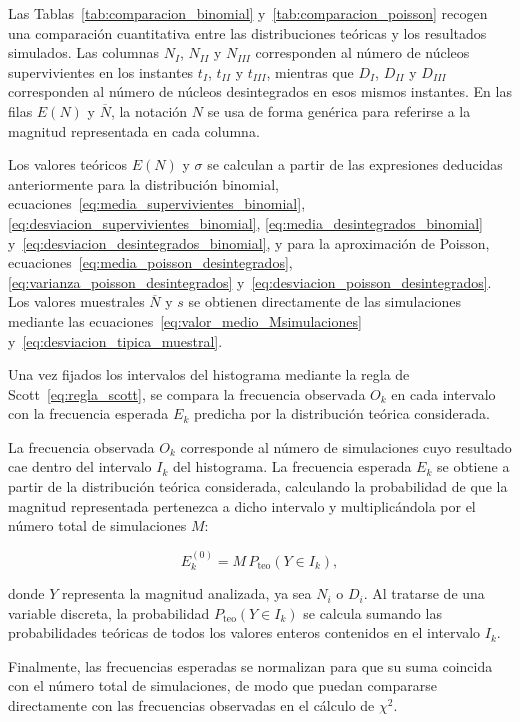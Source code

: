 \documentclass[12pt,a4paper]{article}
\begin{document}
Las Tablas~\ref{tab:comparacion_binomial} y~\ref{tab:comparacion_poisson} recogen una comparación cuantitativa entre las distribuciones teóricas y los resultados simulados. Las columnas $N_I$, $N_{II}$ y $N_{III}$ corresponden al número de núcleos supervivientes en los instantes $t_I$, $t_{II}$ y $t_{III}$, mientras que $D_I$, $D_{II}$ y $D_{III}$ corresponden al número de núcleos desintegrados en esos mismos instantes. En las filas $E(N)$ y $\overline{N}$, la notación $N$ se usa de forma genérica para referirse a la magnitud representada en cada columna.

Los valores teóricos $E(N)$ y $\sigma$ se calculan a partir de las expresiones deducidas anteriormente para la distribución binomial, ecuaciones~\eqref{eq:media_supervivientes_binomial}, \eqref{eq:desviacion_supervivientes_binomial}, \eqref{eq:media_desintegrados_binomial} y~\eqref{eq:desviacion_desintegrados_binomial}, y para la aproximación de Poisson, ecuaciones~\eqref{eq:media_poisson_desintegrados}, \eqref{eq:varianza_poisson_desintegrados} y~\eqref{eq:desviacion_poisson_desintegrados}. Los valores muestrales $\overline{N}$ y $s$ se obtienen directamente de las simulaciones mediante las ecuaciones~\eqref{eq:valor_medio_Msimulaciones} y~\eqref{eq:desviacion_tipica_muestral}.

Una vez fijados los intervalos del histograma mediante la regla de Scott~\eqref{eq:regla_scott}, se compara la frecuencia observada $O_k$ en cada intervalo con la frecuencia esperada $E_k$ predicha por la distribución teórica considerada.

La frecuencia observada $O_k$ corresponde al número de simulaciones cuyo resultado cae dentro del intervalo $I_k$ del histograma. La frecuencia esperada $E_k$ se obtiene a partir de la distribución teórica considerada, calculando la probabilidad de que la magnitud representada pertenezca a dicho intervalo y multiplicándola por el número total de simulaciones $M$:

\begin{equation}
E_k^{(0)}=M\,P_{\mathrm{teo}}(Y\in I_k),
\end{equation}

donde $Y$ representa la magnitud analizada, ya sea $N_i$ o $D_i$. Al tratarse de una variable discreta, la probabilidad $P_{\mathrm{teo}}(Y\in I_k)$ se calcula sumando las probabilidades teóricas de todos los valores enteros contenidos en el intervalo $I_k$.

Finalmente, las frecuencias esperadas se normalizan para que su suma coincida con el número total de simulaciones, de modo que puedan compararse directamente con las frecuencias observadas en el cálculo de $\chi^2$.
\end{document}
